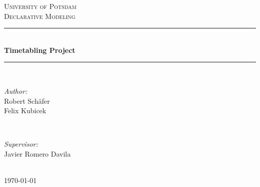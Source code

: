 \documentclass[12pt]{article} %
\begin{document}

\begin{titlepage}

\newcommand{\HRule}{\rule{\linewidth}{0.5mm}} %

\center %

\textsc{\LARGE University of Potsdam}\\[1.5cm] %
\textsc{\Large Declarative Modeling}\\[0.5cm] %

\HRule \\[0.4cm]
{ \huge \bfseries Timetabling Project}\\[0.4cm] %
\HRule \\[1.5cm]

\begin{minipage}{0.4\textwidth}
\begin{flushleft} \large
\emph{Author:}\\
  Robert Sch\"afer \\
  Felix Kubicek
\end{flushleft}
\end{minipage}
~
\begin{minipage}{0.4\textwidth}
\begin{flushright} \large
\emph{Supervisor:} \\
  Javier Romero Davila
\end{flushright}
\end{minipage}\\[4cm]

{\large \today}\\[3cm] %



\vfill %

\end{titlepage}
\end{document}
